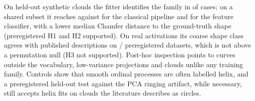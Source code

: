 On \nMethod{} held-out synthetic clouds the fitter identifies the family in \accMethod{} of cases; on a shared subset it reaches \accMethodsub{} against \accBone{} for the classical pipeline and \accBtwo{} for the feature classifier, with a lower median Chamfer distance to the ground-truth shape (preregistered H1 and H2 supported). On real activations its coarse shape class agrees with published descriptions on \hthreeAgree{}/\hthreeN{} preregistered datasets, which is not above a permutation null (H3 not supported). Post-hoc inspection points to curves outside the vocabulary, low-variance projections and clouds unlike any training family. Controls show that smooth ordinal processes are often labelled helix, and a preregistered held-out test against the PCA ringing artifact, while necessary, still accepts helix fits on clouds the literature describes as circles.
